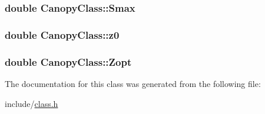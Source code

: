 \subsubsection[{\texorpdfstring{Smax}{Smax}}]{\setlength{\rightskip}{0pt plus 5cm}double Canopy\+Class\+::\+Smax}\hypertarget{class_canopy_class_a569dfd362839f84ccb47390e9c193987}{}\label{class_canopy_class_a569dfd362839f84ccb47390e9c193987}
\subsubsection[{\texorpdfstring{z0}{z0}}]{\setlength{\rightskip}{0pt plus 5cm}double Canopy\+Class\+::z0}\hypertarget{class_canopy_class_a610e754705ee648ce43472ca407f0c07}{}\label{class_canopy_class_a610e754705ee648ce43472ca407f0c07}
\subsubsection[{\texorpdfstring{Zopt}{Zopt}}]{\setlength{\rightskip}{0pt plus 5cm}double Canopy\+Class\+::\+Zopt}\hypertarget{class_canopy_class_aac3992178bc031be49722b94c81686c4}{}\label{class_canopy_class_aac3992178bc031be49722b94c81686c4}


The documentation for this class was generated from the following file\+:\begin{DoxyCompactItemize}
\item 
include/\hyperlink{class_8h}{class.\+h}\end{DoxyCompactItemize}
